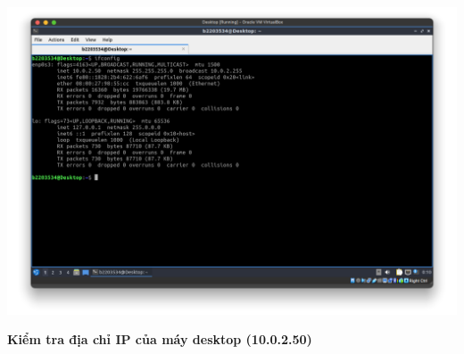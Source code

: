 \begin{minipage}{.93\linewidth}
  \captionsetup{type=figure, skip=-15pt}
  \includegraphics[width=\linewidth]{./imgs/Hinh-21.png}
  \caption{\bfseries Kiểm tra địa chỉ IP của máy desktop (10.0.2.50)}
  \label{fig:check-ip}
\end{minipage}
